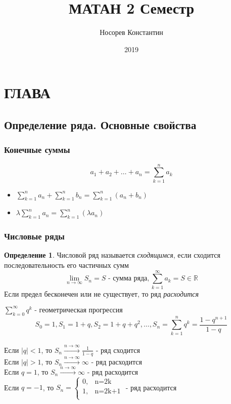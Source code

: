 \documentclass[a4paper]{article}
\title{ МАТАН 2 Семестр}
\author{Носорев Константин}
\date{2019\\}
\theoremstyle{definition}
\newtheorem{definition}{Определение}
\begin{document}
\maketitle
\tableofcontents
\section{ГЛАВА}
\subsection{Определение ряда. Основные свойства}
\setcounter{subsubsection}{-1}
\subsubsection{Конечные суммы}
$$a_1+a_2+\dots+a_n = \sum_{k=1}^{n} a_k$$
\begin{itemize}
 \item $\sum_{k=1}^{n}{a_n} + \sum_{k=1}^{n}{b_n} = \sum_{k=1}^{n}{(a_n+b_n)}$
 \item $\lambda \sum_{k=1}^{n}{a_n} = \sum_{k=1}^{n}{(\lambda a_n)}$
\end{itemize}
\subsubsection{Числовые ряды}
\begin{definition}
 Числовой ряд называется \textit{сходящимся}, если сходится последовательность его частичных сумм\\
 $$\lim_{n\rightarrow \infty}{S_n}=S \text{ - сумма ряда}, \sum_{k=1}^{\infty}{a_k} = S \in \mathbb{R} $$
 Если предел бесконечен или не существует, то ряд \textit{расходится}
\end{definition}
\exmp $\sum_{k=0}^{\infty}{q^k} \text{ - геометрическая прогрессия }$\\
$$S_0 = 1, S_1 = 1+q, S_2= 1 + q +q^2, \dots , S_n = \sum_{k=1}^{n}{q^k} = \frac{1-q^{n+1}}{1-q}$$\\
Если $|q| < 1$, то $S_n \xrightarrow{n\rightarrow \infty} \frac{1}{1-q}$ - ряд сходится\\
Если $|q| > 1$, то $S_n \xrightarrow{n\rightarrow \infty} \infty$ - ряд расходится\\
Если $q = 1$, то $S_n \xrightarrow{n\rightarrow \infty} \infty$ - ряд расходится\\
Если $q = -1$, то $S_n = \begin{cases}
  0, & \text{n=2k}   \\
  1, & \text{n=2k+1} \\
 \end{cases}$ - ряд расходится\\
\end{document}

